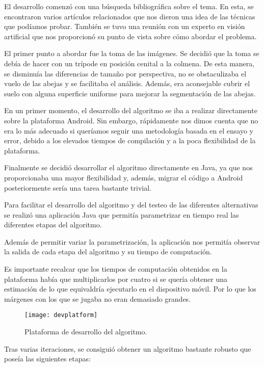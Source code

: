 El desarrollo comenzó con una búsqueda bibliográfica sobre el tema. En
esta, se encontraron varios artículos relacionados que nos dieron una
idea de las técnicas que podíamos probar. También se tuvo una reunión
con un experto en visión artificial que nos proporcionó su punto de
vista sobre cómo abordar el problema.

El primer punto a abordar fue la toma de las imágenes. Se decidió que la
toma se debía de hacer con un trípode en posición cenital a la colmena.
De esta manera, se disminuía las diferencias de tamaño por perspectiva,
no se obstaculizaba el vuelo de las abejas y se facilitaba el análisis.
Además, era aconsejable cubrir el suelo con alguna superficie uniforme
para mejorar la segmentación de las abejas.


En un primer momento, el desarrollo del algoritmo se iba a realizar
directamente sobre la plataforma Android. Sin embargo, rápidamente nos
dimos cuenta que no era lo más adecuado si queríamos seguir una
metodología basada en el ensayo y error, debido a los elevados tiempos
de compilación y a la poca flexibilidad de la plataforma.

Finalmente se decidió desarrollar el algoritmo directamente en Java, ya
que nos proporcionaba una mayor flexibilidad y, además, migrar el código
a Android posteriormente sería una tarea bastante trivial.

Para facilitar el desarrollo del algoritmo y del testeo de las
diferentes alternativas se realizó una aplicación Java que permitía
parametrizar en tiempo real las diferentes etapas del algoritmo.

Además de permitir variar la parametrización, la aplicación nos permitía
observar la salida de cada etapa del algoritmo y su tiempo de
computación.

Es importante recalcar que los tiempos de computación obtenidos en la
plataforma había que multiplicarlos por cuatro si se quería obtener una
estimación de lo que equivaldría ejecutarlo en el dispositivo móvil. Por
lo que los márgenes con los que se jugaba no eran demasiado grandes.

\begin{figure}[H]
	\centering
	\texttt{[image: devplatform]}
	\caption{Plataforma de desarrollo del algoritmo.}
	\label{fig:devplatform1}
\end{figure}

Tras varias iteraciones, se consiguió obtener un algoritmo bastante
robusto que poseía las siguientes etapas:

